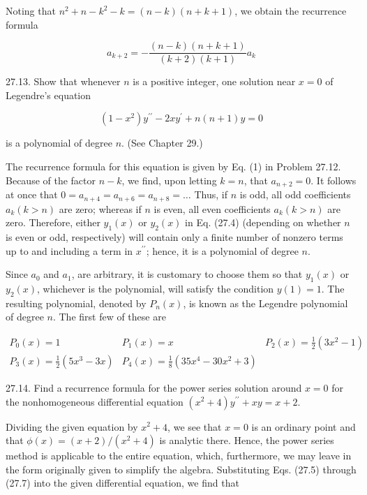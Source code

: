 \documentclass[10pt]{article}
\begin{document}
Noting that $n^{2}+n-k^{2}-k=(n-k)(n+k+1)$, we obtain the recurrence formula


\begin{equation*}
a_{k+2}=-\frac{(n-k)(n+k+1)}{(k+2)(k+1)} a_{k} \tag{1}
\end{equation*}


27.13. Show that whenever $n$ is a positive integer, one solution near $x=0$ of Legendre's equation

$$
\left(1-x^{2}\right) y^{\prime \prime}-2 x y^{\prime}+n(n+1) y=0
$$

is a polynomial of degree $n$. (See Chapter 29.)

The recurrence formula for this equation is given by Eq. (1) in Problem 27.12. Because of the factor $n-k$, we find, upon letting $k=n$, that $a_{n+2}=0$. It follows at once that $0=a_{n+4}=a_{n+6}=a_{n+8}=\ldots$ Thus, if $n$ is odd, all odd coefficients $a_{k}(k>n)$ are zero; whereas if $n$ is even, all even coefficients $a_{k}(k>n)$ are zero. Therefore, either $y_{1}(x)$ or $y_{2}(x)$ in Eq. (27.4) (depending on whether $n$ is even or odd, respectively) will contain only a finite number of nonzero terms up to and including a term in $x^{\prime \prime}$; hence, it is a polynomial of degree $n$.

Since $a_{0}$ and $a_{1}$, are arbitrary, it is customary to choose them so that $y_{1}(x)$ or $y_{2}(x)$, whichever is the polynomial, will satisfy the condition $y(1)=1$. The resulting polynomial, denoted by $P_{n}(x)$, is known as the Legendre polynomial of degree $n$. The first few of these are

$$
\begin{array}{lll}
P_{0}(x)=1 & P_{1}(x)=x & P_{2}(x)=\frac{1}{2}\left(3 x^{2}-1\right) \\
P_{3}(x)=\frac{1}{2}\left(5 x^{3}-3 x\right) & P_{4}(x)=\frac{1}{8}\left(35 x^{4}-30 x^{2}+3\right)
\end{array}
$$

27.14. Find a recurrence formula for the power series solution around $x=0$ for the nonhomogeneous differential equation $\left(x^{2}+4\right) y^{\prime \prime}+x y=x+2$.

Dividing the given equation by $x^{2}+4$, we see that $x=0$ is an ordinary point and that $\phi(x)=(x+2) /\left(x^{2}+4\right)$ is analytic there. Hence, the power series method is applicable to the entire equation, which, furthermore, we may leave in the form originally given to simplify the algebra. Substituting Eqs. (27.5) through (27.7) into the given differential equation, we find that
\end{document}
